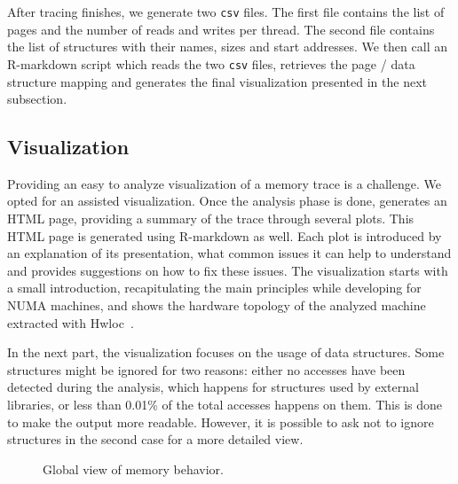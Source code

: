 After tracing finishes, we generate two \texttt{csv} files.
The first file contains the list of pages and the number of reads
and writes per thread. The second file contains the
list of structures with their names, sizes and start addresses.
We then call an R-markdown script which reads the two \texttt{csv} files,
retrieves the page / data structure mapping and generates the final
visualization presented in the next subsection.


\subsection{Visualization}
\label{sec:design-visu}

Providing an easy to analyze visualization of a memory trace is a challenge. We
opted for an assisted visualization. Once the analysis phase is done, \TABARNAC
generates an HTML page, providing a summary of the trace through several
plots. This HTML page is generated using R-markdown as well. Each plot is
introduced by an explanation of its presentation, what common issues it can
help to understand and provides suggestions on how to fix these issues.
The visualization starts with a small introduction, recapitulating the main
principles while developing for NUMA machines, and shows the hardware topology of the analyzed machine extracted with Hwloc~\cite{Broquedis10hwloc}.

In the next part, the visualization focuses on the usage of data structures. Some
structures might be ignored for two reasons: either no accesses have been
detected during the analysis, which happens for structures used by external
libraries, or less than 0.01\% of the total accesses happens on them. This is
done to make the output more readable. However, it is possible to ask
\TABARNAC not to ignore structures in the second case for a more detailed view.

\begin{figure}[htb]
    \centering
    \label{fig:example_plot1}
    \caption{Global view of memory behavior.}
\end{figure}

